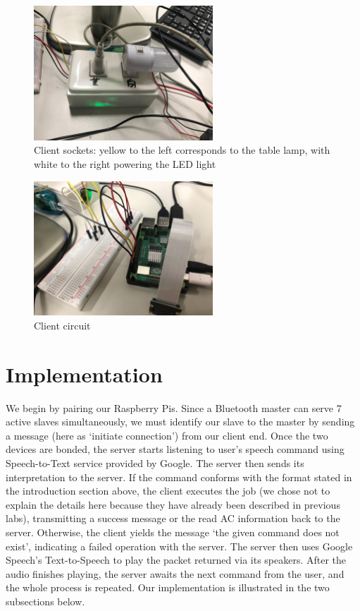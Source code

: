\documentclass[12pt, a4paper, onside]{article}
\begin{document}
\begin{figure}[h]
  \centering
  \includegraphics[angle=180, origin=c, width=0.6\textwidth]{img/client_sockets}
  \caption{Client sockets: yellow to the left corresponds to the table lamp, with white to the right powering the LED light}
\end{figure}
\begin{figure}[h]
  \centering
  \includegraphics[angle=180, origin=c, width=0.6\textwidth]{img/client_circuit}
  \caption{Client circuit}
\end{figure}

\clearpage

\section{Implementation}
We begin by pairing our Raspberry Pis. Since a Bluetooth master can serve 7 active slaves simultaneously, we must identify our slave to the master by sending a message (here as `initiate connection') from our client end. Once the two devices are bonded, the server starts listening to user's speech command using Speech-to-Text service provided by Google. The server then sends its interpretation to the server. If the command conforms with the format stated in the introduction section above, the client executes the job (we chose not to explain the details here because they have already been described in previous labs), transmitting a success message or the read AC information back to the server. Otherwise, the client yields the message `the given command does not exist', indicating a failed operation with the server. The server then uses Google Speech's Text-to-Speech to play the packet returned via its speakers. After the audio finishes playing, the server awaits the next command from the user, and the whole process is repeated. Our implementation is illustrated in the two subsections below.
\end{document}
